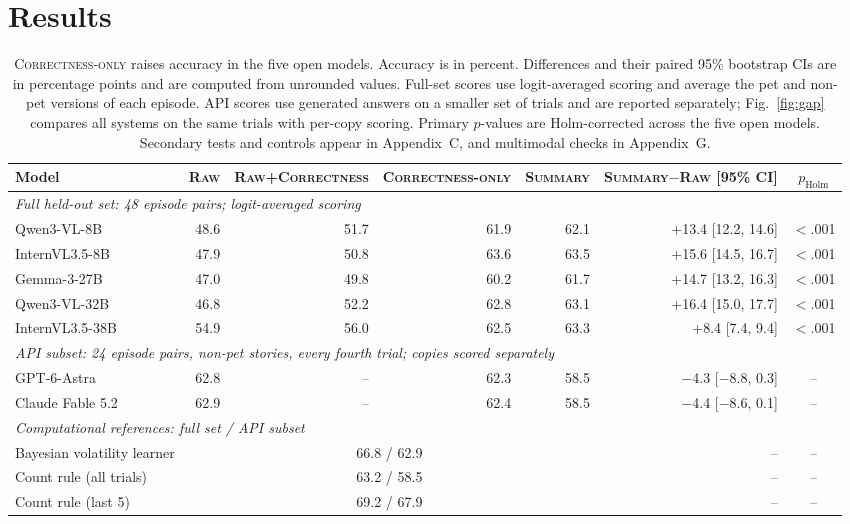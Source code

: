 \documentclass[letterpaper]{article} %
\newcommand{\Raw}{\textsc{Raw}}
\newcommand{\RawCorrectness}{\textsc{Raw+Correctness}}
\newcommand{\CorrectnessOnly}{\textsc{Correctness-only}}
\newcommand{\Summary}{\textsc{Summary}}
\begin{document}
\section{Results}
\begin{table}[t]\centering\small
  \setlength{\tabcolsep}{6pt}
  \begin{tabular}{l rrrr r c}
    \toprule
    Model & \Raw{} & \RawCorrectness{} & \CorrectnessOnly{} & \Summary{} & \Summary{}$-$\Raw{} [95\% CI] & $p_\text{Holm}$ \\
    \midrule
    \multicolumn{7}{l}{\textit{Full held-out set: 48 episode pairs; logit-averaged scoring}} \\
    Qwen3-VL-8B & 48.6 & 51.7 & 61.9 & 62.1 & +13.4 [12.2, 14.6] & $<$.001 \\
    InternVL3.5-8B & 47.9 & 50.8 & 63.6 & 63.5 & +15.6 [14.5, 16.7] & $<$.001 \\
    Gemma-3-27B & 47.0 & 49.8 & 60.2 & 61.7 & +14.7 [13.2, 16.3] & $<$.001 \\
    Qwen3-VL-32B & 46.8 & 52.2 & 62.8 & 63.1 & +16.4 [15.0, 17.7] & $<$.001 \\
    InternVL3.5-38B & 54.9 & 56.0 & 62.5 & 63.3 & +8.4 [7.4, 9.4] & $<$.001 \\
    \midrule
    \multicolumn{7}{l}{\textit{API subset: 24 episode pairs, non-pet stories, every fourth trial; copies scored separately}} \\
    GPT-6-Astra & 62.8 & -- & 62.3 & 58.5 & $-$4.3 [$-$8.8, 0.3] & -- \\
    Claude Fable 5.2 & 62.9 & -- & 62.4 & 58.5 & $-$4.4 [$-$8.6, 0.1] & -- \\
    \midrule
    \multicolumn{7}{l}{\textit{Computational references: full set / API subset}} \\
    Bayesian volatility learner & \multicolumn{4}{c}{66.8 / 62.9} & -- & -- \\
    Count rule (all trials) & \multicolumn{4}{c}{63.2 / 58.5} & -- & -- \\
    Count rule (last 5) & \multicolumn{4}{c}{69.2 / 67.9} & -- & -- \\
    \bottomrule
  \end{tabular}
  \caption{\CorrectnessOnly{} raises accuracy in the five open models. Accuracy is in percent. Differences and their paired 95\% bootstrap CIs are in percentage points and are computed from unrounded values. Full-set scores use logit-averaged scoring and average the pet and non-pet versions of each episode. API scores use generated answers on a smaller set of trials and are reported separately; Fig.~\ref{fig:gap} compares all systems on the same trials with per-copy scoring. Primary $p$-values are Holm-corrected across the five open models. Secondary tests and controls appear in Appendix~C, and multimodal checks in Appendix~G.}
  \label{tab:main}
\end{table}
\end{document}
